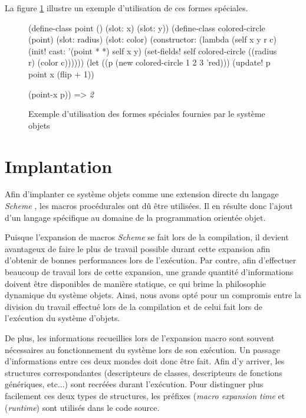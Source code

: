 \documentclass[12pt,twoside,letterpaper,francais]{book}
\newcommand{\Schemelang}{{\textit{Scheme }}}
\newcommand{\scheme}[1]{\selectlanguage{english}{\tt #1}\selectlanguage{french}}
\newcommand{\schemeresult}[1]{{\it #1}}
\begin{document}
La figure \ref{OO:specform} illustre un exemple d'utilisation de ces
formes spéciales.

\begin{figure}[h!]
  \begin{schemecode}
(define-class point () (slot: x) (slot: y))
(define-class colored-circle (point) (slot: radius) (slot: color)
  (constructor:
   (lambda (self x y r c)
     (init! cast: '(point * *) self x y)
     (set-fields! self colored-circle ((radius r) (color c))))))
(let ((p (new colored-circle 1 2 3 'red)))
  (update! p point x (flip + 1))
  
  (point-x p)) => \schemeresult{2}
  \end{schemecode}
  \caption{Exemple d'utilisation des formes spéciales fournies par le
    système objets}
  \label{OO:specform}
\end{figure}


\FloatBarrier
\section{Implantation}
Afin d'implanter ce système objets comme une extension directe du
langage \Schemelang, les macros procédurales ont dû être utilisées. Il
en résulte donc l'ajout d'un langage spécifique au domaine de la
programmation orientée objet.

Puisque l'expansion de macros \Schemelang se fait lors de la
compilation, il devient avantageux de faire le plus de travail
possible durant cette expansion afin d'obtenir de bonnes performances
lors de l'exécution. Par contre, afin d'effectuer beaucoup de travail
lors de cette expansion, une grande quantité d'informations doivent
être disponibles de manière statique, ce qui brime la philosophie
dynamique du système objets. Ainsi, nous avons opté pour un compromis
entre la division du travail effectué lors de la compilation et de
celui fait lors de l'exécution du système d'objets.

De plus, les informations recueillies lors de l'expansion macro sont
souvent nécessaires au fonctionnement du système lors de son
exécution.  Un passage d'informations entre ces deux mondes doit donc
être fait. Afin d'y arriver, les structures correspondantes
(descripteurs de classes, descripteurs de fonctions génériques,
etc...)  sont recréées durant l'exécution. Pour distinguer plus
facilement ces deux types de structures, les préfixes \scheme{mt}
(\textit{macro expansion time} et \scheme{rt} (\textit{runtime}) sont
utilisés dans le code source.
\end{document}
